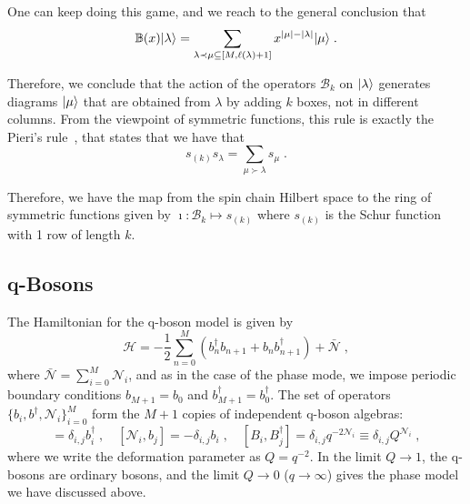\documentclass[a4paper,11pt]{amsart}
\begin{document}
One can keep doing this game, and we reach to the general conclusion that 
\begin{equation}
  \mathbb{B}(x) \lvert\lambda\rangle  =
  \sum_{\lambda \prec \mu \subseteq [M,\ell(\lambda) + 1]} x^{|\mu|-|\lambda|} \lvert\mu\rangle\; .
\end{equation}

Therefore, we conclude that the action of the operators
\(\mathcal{B}_k\) on \(\lvert\lambda\rangle\) generates diagrams
\(\lvert\mu\rangle\) that are obtained from \(\lambda\) by adding \(k\) boxes,
not in different columns. From the viewpoint of symmetric functions, this rule
is exactly the Pieri's rule~\cite{Macdonald:1998}, that states that
we have that
\begin{equation}
  s_{(k)} s_\lambda = \sum_{\mu \succ \lambda} s_\mu\;.
\end{equation}

Therefore, we have the map from the spin chain Hilbert space to the
ring of symmetric functions given by \(\imath : \mathcal{B}_k \mapsto
s_{(k)}\) where \(s_{(k)}\) is the Schur function with 1 row of length
\(k\).





\subsection{q-Bosons}
The Hamiltonian for the q-boson model is
given by
\begin{equation}
  \mathcal{H} = -\frac{1}{2} \sum_{n=0}^M
  \left(b_n^\dagger b_{n+1} + b_n b_{n+1}^\dagger \right) + \bar{\mathcal{N}}\; ,
\end{equation}
where \(\bar{\mathcal{N}} = \sum_{i=0}^M \mathcal{N}_i\), and as in
the case of the phase mode, we impose periodic boundary conditions
\(b_{M+1} = b_0\) and \(b_{M+1}^\dagger = b_0^\dagger\). The set of
operators \(\{b_i, b^\dagger,\mathcal{N}_i\}_{i=0}^M\) form the
\(M+1\) copies of independent q-boson algebras:
\begin{equation}
[\mathcal{N}_i, b_j^\dagger]=\delta_{i,j} b_i^\dagger\; , \quad 
[\mathcal{N}_i, b_j]=-\delta_{i,j}b_i\; , \quad
[B_i, B_j^\dagger]= \delta_{i,j} q^{-2\mathcal{N}_i}  \equiv \delta_{i,j} Q^{\mathcal{N}_i}\; , 
\end{equation}
where we write the deformation parameter as \(Q = q^{-2}\). 
In the limit \(Q\to 1\), the q-bosons are ordinary bosons, and 
the limit \(Q\to 0\) (\(q\to \infty\)) gives the phase model we have discussed above. 
\end{document}

